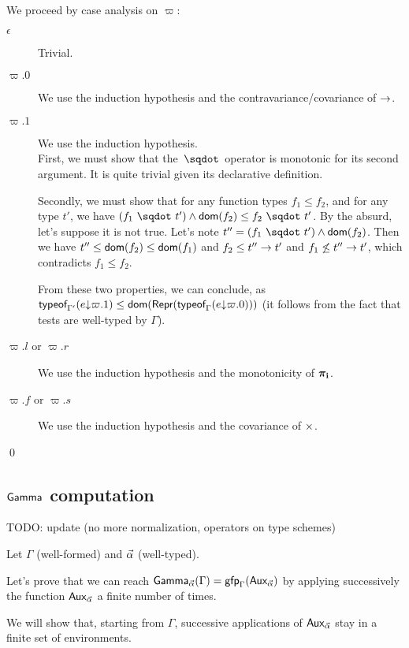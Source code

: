 \documentclass[a4paper]{article}
\theoremstyle{definition}
\begin{document}
      We proceed by case analysis on $\varpi$:
      \begin{description}
        \item[$\epsilon$] Trivial.
        \item[$\varpi.0$] We use the induction hypothesis and the contravariance/covariance of $\arrow {} {}$.
        \item[$\varpi.1$] We use the induction hypothesis.\\
        First, we must show that the $\worra {} {}$ operator is monotonic for its second argument.
        It is quite trivial given its declarative definition.

        Secondly, we must show that for any function types $f_1 \leq f_2$, and for any type $t'$,
        we have $(\worra {f_1} {t'}) \land \dom {f_2} \leq \worra {f_2} {t'}$. By the absurd, let's suppose it is not true.
        Let's note $t'' = (\worra {f_1} {t'}) \land \dom {f_2}$.
        Then we have $t'' \leq \dom {f_2} \leq \dom {f_1}$ and $f_2 \leq \arrow {t''} {t'}$ and
        $f_1 \not\leq \arrow {t''} {t'}$, which contradicts $f_1 \leq f_2$.

        From these two properties, we can conclude, as $\tyof {\occ e {\varpi.1}} {\Gamma'} \leq \dom {\tsrep {\tyof{\occ e{\varpi.0}}\Gamma}}$
        (it follows from the fact that tests are well-typed by $\Gamma$).
        \item[$\varpi.l$ or $\varpi.r$] We use the induction hypothesis and the monotonicity of $\bpi_{\mathbf{i}}$.
        \item[$\varpi.f$ or $\varpi.s$] We use the induction hypothesis and the covariance of $\pair {} {}$.
      \end{description}
    
      \qed

    \subsection{$\Ga {}$ computation}

    TODO: update (no more normalization, operators on type schemes)

    Let $\Gamma$ (well-formed) and $\tenv$ (well-typed).

    Let's prove that we can reach $\Genv \tenv \Gamma=\fixpoint_\Gamma (\Gaa \tenv)$ by applying successively the function $\Gaa \tenv$ a finite number of times.

    We will show that, starting from $\Gamma$, successive applications of $\Gaa \tenv$ stay in a finite set of environments.
\end{document}
